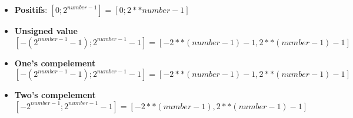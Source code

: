 \begin{itemize}
\item \textbf{Positifs}: $[0; 2^{ {{ number }}-1 }] = [0; {{ 2**number-1}}]$
\item \textbf{Unsigned value} $[-(2^{ {{ number-1 }} }-1 );2^{ {{ number-1 }} }-1] = [-{{ 2**(number-1)-1 }}, {{ 2**(number-1)-1 }}]$
\item \textbf{One's compelement} $[-(2^{ {{ number-1 }} }-1 );2^{ {{ number-1 }} }-1] = [-{{ 2**(number-1)-1 }}, {{ 2**(number-1)-1 }}]$
\item \textbf{Two's compelement} $[-2^{ {{ number-1 }} } ;2^{ {{ number-1 }} }-1] = [-{{ 2**(number-1) }}, {{ 2**(number-1)-1 }}]$
\end{itemize}